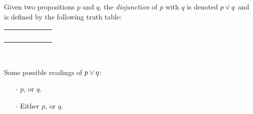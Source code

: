 \begin{definition}[Disjunction]
    \begin{center}
        \begin{minipage}[t]{.55\linewidth}
            Given two propositions \(p\) and \(q\), the \emph{disjunction} of \(p\) with \(q\)
            is denoted \(p \vee q\) and is defined by the following truth table:
            \begin{table}[H]
                \centering
                \label{tab:or}
                \begin{tabular}{|CcCc||Cc|}
                    \hline
                     &  &  \\ \hline
                    \thead{\(\top\)} & \thead{\(\top\)} &  \\
                    \thead{\(\top\)} & \thead{\(\bot\)} &  \\
                    \thead{\(\bot\)} & \thead{\(\top\)} &  \\
                    \thead{\(\bot\)} & \thead{\(\bot\)} &  \\ \hline
                \end{tabular}
            \end{table}
        \end{minipage}%
        \begin{minipage}[t]{.05\linewidth}
            ~
        \end{minipage}%
        \begin{minipage}[t]{.4\linewidth}
            Some possible readings of \(p \vee q\):\\
            \begin{itemize}
                \item[\(\cdot\)]
                    \(p\), or \(q\).
                \item[\(\cdot\)]
                    Either \(p\), or \(q\).
            \end{itemize}
        \end{minipage}
    \end{center}
\end{definition}

